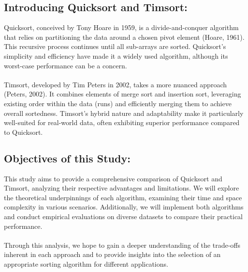 \documentclass[a4paper,10pt,twocolumn]{article}
\begin{document}
\subsection{Introducing Quicksort and Timsort:}
Quicksort, conceived by Tony Hoare in 1959, is a divide-and-conquer algorithm that relies on partitioning the data around a chosen pivot element (Hoare, 1961). This recursive process continues until all sub-arrays are sorted. Quicksort's simplicity and efficiency have made it a widely used algorithm, although its worst-case performance can be a concern.\\\\
Timsort, developed by Tim Peters in 2002, takes a more nuanced approach (Peters, 2002). It combines elements of merge sort and insertion sort, leveraging existing order within the data (runs) and efficiently merging them to achieve overall sortedness. Timsort's hybrid nature and adaptability make it particularly well-suited for real-world data, often exhibiting superior performance compared to Quicksort.

\subsection{Objectives of this Study:}
This study aims to provide a comprehensive comparison of Quicksort and Timsort, analyzing their respective advantages and limitations. We will explore the theoretical underpinnings of each algorithm, examining their time and space complexity in various scenarios. Additionally, we will implement both algorithms and conduct empirical evaluations on diverse datasets to compare their practical performance.
\\\\
Through this analysis, we hope to gain a deeper understanding of the trade-offs inherent in each approach and to provide insights into the selection of an appropriate sorting algorithm for different applications.
\end{document}
